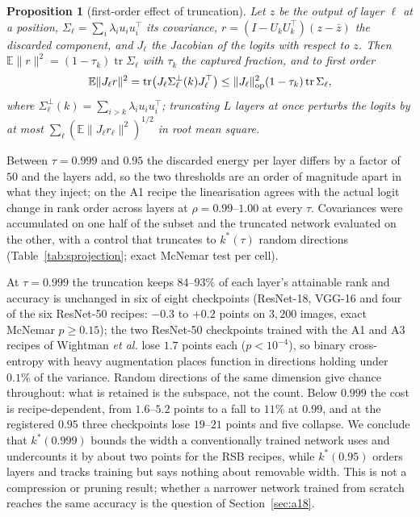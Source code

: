 \documentclass[10pt,journal,compsoc]{IEEEtran}
\newtheorem{proposition}{Proposition}
\begin{document}
\begin{proposition}[first-order effect of truncation]
\label{prop:truncation}
Let $z$ be the output of layer $\ell$ at a position, $\Sigma_\ell = \sum_i \lambda_i u_i u_i^{\top}$ its covariance, $r = (I - U_k U_k^{\top})(z - \bar z)$ the discarded component, and $J_\ell$ the Jacobian of the logits with respect to $z$. Then $\mathbb{E}\|r\|^2 = (1 - \tau_k)\operatorname{tr}\Sigma_\ell$ with $\tau_k$ the captured fraction, and to first order
\[
  \mathbb{E}\|J_\ell r\|^2 = \operatorname{tr}\bigl(J_\ell \Sigma_\ell^{\perp}(k) J_\ell^{\top}\bigr) \le \|J_\ell\|_{\rm op}^2 (1 - \tau_k) \operatorname{tr}\Sigma_\ell,
\]
where $\Sigma_\ell^{\perp}(k) = \sum_{i > k} \lambda_i u_i u_i^{\top}$; truncating $L$ layers at once perturbs the logits by at most $\sum_\ell (\mathbb{E}\|J_\ell r_\ell\|^2)^{1/2}$ in root mean square.
\end{proposition}

Between $\tau = 0.999$ and $0.95$ the discarded energy per layer differs by
a factor of $50$ and the layers add, so the two thresholds are an order of
magnitude apart in what they inject; on the A1 recipe the linearisation
agrees with the actual logit change in rank order across layers at
$\rho = 0.99$--$1.00$ at every $\tau$. Covariances were accumulated on one
half of the subset and the truncated network evaluated on the other, with
a control that truncates to $k^*(\tau)$ random directions
(Table~\ref{tab:sprojection}; exact McNemar test per cell).


At $\tau = 0.999$ the truncation keeps $84$--$93\%$ of each layer's
attainable rank and accuracy is unchanged in six of eight checkpoints
(ResNet-18, VGG-16 and four of the six ResNet-50 recipes: $-0.3$ to
$+0.2$ points on $3{,}200$ images, exact McNemar $p \ge 0.15$); the two
ResNet-50 checkpoints
trained with the A1 and A3 recipes of Wightman \emph{et al.}
\cite{wightman2021rsb} lose $1.7$ points each ($p < 10^{-4}$), so binary
cross-entropy with heavy augmentation places function in directions
holding under $0.1\%$ of the variance. Random directions of the same
dimension give chance throughout: what is retained is the subspace, not
the count. Below $0.999$ the cost is recipe-dependent, from $1.6$--$5.2$
points to a fall to $11\%$ at $0.99$, and at the registered $0.95$ three
checkpoints lose $19$--$21$ points and five collapse. We conclude that
$k^*(0.999)$ bounds the width a conventionally trained network uses and
undercounts it by about two points for the RSB recipes, while
$k^*(0.95)$ orders layers and tracks training but says nothing about
removable width. This is not a compression or pruning result; whether a
narrower network trained from scratch reaches the same accuracy is the
question of Section~\ref{sec:a18}.
\end{document}
